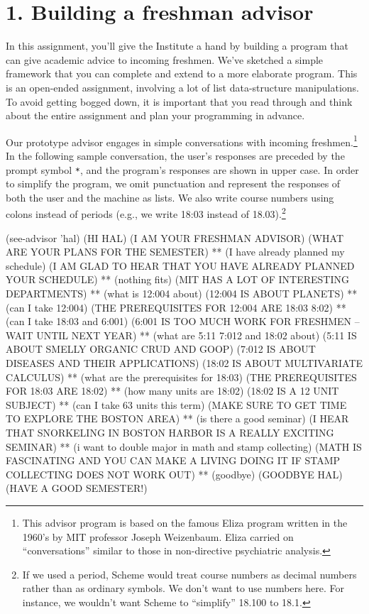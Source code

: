 \pagebreak


\section{1. Building a freshman advisor}

In this assignment, you'll give the Institute a hand by building a
program that can give academic advice to incoming freshmen.  We've
sketched a simple framework that you can complete and extend to a more
elaborate program.  This is an open-ended assignment, involving a lot
of list data-structure manipulations.  To avoid getting bogged down,
it is important that you read through and think about the entire
assignment and plan your programming in advance.

Our prototype advisor engages in simple conversations with incoming
freshmen.\footnote{This advisor program is based on the famous Eliza
program written in the 1960's by MIT professor Joseph Weizenbaum.
Eliza carried on ``conversations'' similar to those in non-directive
psychiatric analysis.} In the following sample conversation, the
user's responses are preceded by the prompt symbol {\tt **}, and the
program's responses are shown in upper case.  In order to simplify the
program, we omit punctuation and represent the responses of both the
user and the machine as lists.  We also write course numbers using
colons instead of periods (e.g., we write 18:03 instead of
18.03).\footnote{If we used a period, Scheme would treat course
numbers as decimal numbers rather than as ordinary symbols.  We don't
want to use numbers here.  For instance, we wouldn't want Scheme to
``simplify'' 18.100 to 18.1.}

\beginlisp
(see-advisor 'hal)
(HI HAL)
(I AM YOUR FRESHMAN ADVISOR)
(WHAT ARE YOUR PLANS FOR THE SEMESTER)
** (I have already planned my schedule)
(I AM GLAD TO HEAR THAT YOU HAVE ALREADY PLANNED YOUR SCHEDULE)
** (nothing fits)
(MIT HAS A LOT OF INTERESTING DEPARTMENTS)
** (what is 12:004 about)
(12:004 IS ABOUT PLANETS)
** (can I take 12:004)
(THE PREREQUISITES FOR 12:004 ARE 18:03 8:02)
** (can I take 18:03 and 6:001)
(6:001 IS TOO MUCH WORK FOR FRESHMEN -- WAIT UNTIL NEXT YEAR)
** (what are 5:11 7:012 and 18:02 about)
(5:11 IS ABOUT SMELLY ORGANIC CRUD AND GOOP)
(7:012 IS ABOUT DISEASES AND THEIR APPLICATIONS)
(18:02 IS ABOUT MULTIVARIATE CALCULUS)
** (what are the prerequisites for 18:03)
(THE PREREQUISITES FOR 18:03 ARE 18:02)
** (how many units are 18:02)
(18:02 IS A 12 UNIT SUBJECT)
** (can I take 63 units this term)
(MAKE SURE TO GET TIME TO EXPLORE THE BOSTON AREA)
** (is there a good seminar)
(I HEAR THAT SNORKELING IN BOSTON HARBOR IS A REALLY EXCITING SEMINAR)
** (i want to double major in math and stamp collecting)
(MATH IS FASCINATING AND YOU CAN MAKE A LIVING DOING IT
 IF STAMP COLLECTING DOES NOT WORK OUT)
** (goodbye)
(GOODBYE HAL)
(HAVE A GOOD SEMESTER!)
\endlisp

